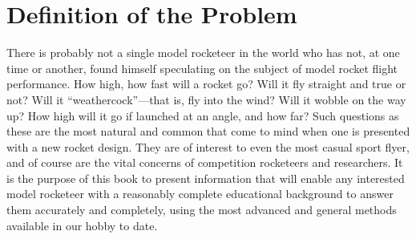 
\section{Definition of the Problem}\label{ch1:sec:1}

There is probably not a single model rocketeer in the world who has not, at one time or another, found himself speculating on the subject of model rocket flight performance. How high, how fast will a rocket go? Will it fly straight and true or not? Will it ``weathercock''---that is, fly into the wind? Will it wobble on the way up? How high will it go if launched at an angle, and how far? Such questions as these are the most natural and common that come to mind when one is presented with a new rocket design. They are of interest to even the most casual sport flyer, and of course are the vital concerns of competition rocketeers and researchers. It is the purpose of this book to present information that will enable any interested model rocketeer with a reasonably complete educational background to answer them accurately and completely, using the most advanced and general methods available in our hobby to date.

